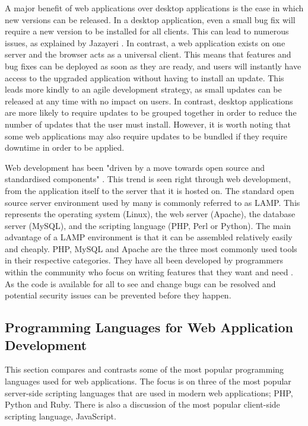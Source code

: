 \documentclass[authoryearcitations]{UoYCSproject}
\begin{document}
A major benefit of web applications over desktop applications is the ease in which new versions can be released. In a desktop application, even a small bug fix will require a new version to be installed for all clients. This can lead to numerous issues, as explained by Jazayeri \citep{Jazayeri2007}. In contrast, a web application exists on one server and the browser acts as a universal client. This means that features and bug fixes can be deployed as soon as they are ready, and users will instantly have access to the upgraded application without having to install an update. This leads more kindly to an agile development strategy, as small updates can be released at any time with no impact on users. In contrast, desktop applications are more likely to require updates to be grouped together in order to reduce the number of updates that the user must install. However, it is worth noting that some web applications may also require updates to be bundled if they require downtime in order to be applied.  

Web development has been "driven by a move towards open source and standardised components" \citep{Jazayeri2007}. This trend is seen right through web development, from the application itself to the server that it is hosted on. The standard open source server environment used by many is commonly referred to as LAMP. This represents the operating system (Linux), the web server (Apache), the database server (MySQL), and the scripting language (PHP, Perl or Python). The main advantage of a  LAMP environment is that it can be assembled relatively easily and cheaply. PHP, MySQL and Apache are the three most commonly used tools in their respective categories. They have all been developed by programmers within the community who focus on writing features that they want and need \citep{Nixon2009}. As the code is available for all to see and change bugs can be resolved and potential security issues can be prevented before they happen.


\subsection{Programming Languages for Web Application Development}
\label{webproglanguages}

This section compares and contrasts some of the most popular programming languages used for web applications. The focus is on three of the most popular server-side scripting languages that are used in modern web applications; PHP, Python and Ruby. There is also a discussion of the most popular client-side scripting language, JavaScript.
\end{document}
